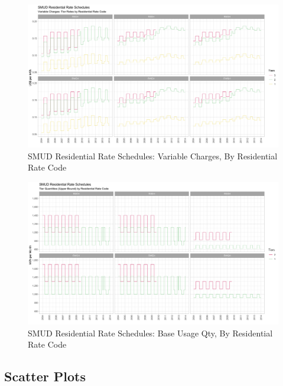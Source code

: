 \clearpage
\begin{figure}
    \centering
    \includegraphics[scale = 0.105]{02_Plots/SMUD-Residential-Rate-Schedules_Variable-Charge_Normalized-Rate-Codes}
    \caption{SMUD Residential Rate Schedules: Variable Charges, By Residential Rate Code}
    \label{Figure:Residential-Rate-Schedules_Variable-Charges_By-Rate-Code}
\end{figure}
\vspace{0.3cm}

\begin{figure}
    \centering
    \includegraphics[scale = 0.105]{02_Plots/SMUD-Residential-Rate-Schedules_Qty_Normalized-Rate-Codes}
    \caption{SMUD Residential Rate Schedules: Base Usage Qty, By Residential Rate Code}
    \label{Figure:Residential-Rate-Schedules_Base-Usage-Qty_By-Rate-Code}
\end{figure}


\subsection{Scatter Plots}
